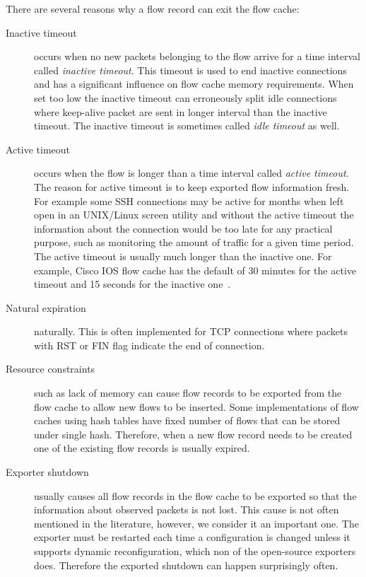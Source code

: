There are several reasons why a flow record can exit the flow cache:
\begin{description}
	\item[Inactive timeout] occurs when no new packets belonging to the flow arrive for a time interval called \emph{inactive timeout}. This timeout is used to end inactive connections and has a significant influence on flow cache memory requirements. When set too low the inactive timeout can erroneously split idle connections where keep-alive packet are sent in longer interval than the inactive timeout. The inactive timeout is sometimes called \emph{idle timeout} as well.
	\item[Active timeout] occurs when the flow is longer than a time interval called \emph{active timeout}. The reason for active timeout is to keep exported flow information fresh. For example some SSH connections may be active for months when left open in an UNIX/Linux screen utility and without the active timeout the information about the connection would be too late for any practical purpose, such as monitoring the amount of traffic for a given time period. The active timeout is usually much longer than the inactive one. For example, Cisco IOS flow cache has the default of 30 minutes for the active timeout and 15 seconds for the inactive one~\cite{CiscoSystems-2013-Cisco}.
	\item[Natural expiration] naturally. This is often implemented for TCP connections where packets with RST or FIN flag indicate the end of connection.
	\item[Resource constraints] such as lack of memory can cause flow records to be exported from the flow cache to allow new flows to be inserted. Some implementations of flow caches using hash tables have fixed number of flows that can be stored under single hash. Therefore, when a new flow record needs to be created one of the existing flow records is usually expired.
	\item[Exporter shutdown] usually causes all flow records in the flow cache to be exported so that the information about observed packets is not lost. This cause is not often mentioned in the literature, however, we consider it an important one. The exporter must be restarted each time a configuration is changed unless it supports dynamic reconfiguration, which non of the open-source exporters does. Therefore the exported shutdown can happen surprisingly often.
\end{description}

